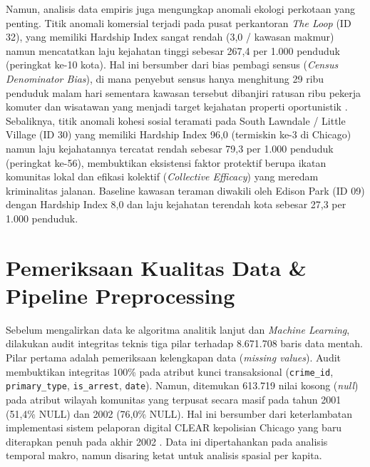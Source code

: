 \documentclass[11pt,a4paper]{article}
\begin{document}
Namun, analisis data empiris juga mengungkap anomali ekologi perkotaan yang penting. Titik anomali komersial terjadi pada pusat perkantoran \textit{The Loop} (ID 32), yang memiliki Hardship Index sangat rendah (3,0 / kawasan makmur) namun mencatatkan laju kejahatan tinggi sebesar 267,4 per 1.000 penduduk (peringkat ke-10 kota). Hal ini bersumber dari bias pembagi sensus (\textit{Census Denominator Bias}), di mana penyebut sensus hanya menghitung 29 ribu penduduk malam hari sementara kawasan tersebut dibanjiri ratusan ribu pekerja komuter dan wisatawan yang menjadi target kejahatan properti oportunistik \cite{campedelli2020}. Sebaliknya, titik anomali kohesi sosial teramati pada South Lawndale / Little Village (ID 30) yang memiliki Hardship Index 96,0 (termiskin ke-3 di Chicago) namun laju kejahatannya tercatat rendah sebesar 79,3 per 1.000 penduduk (peringkat ke-56), membuktikan eksistensi faktor protektif berupa ikatan komunitas lokal dan efikasi kolektif (\textit{Collective Efficacy}) yang meredam kriminalitas jalanan. Baseline kawasan teraman diwakili oleh Edison Park (ID 09) dengan Hardship Index 8,0 dan laju kejahatan terendah kota sebesar 27,3 per 1.000 penduduk.

\section{Pemeriksaan Kualitas Data \& Pipeline Preprocessing}

Sebelum mengalirkan data ke algoritma analitik lanjut dan \textit{Machine Learning}, dilakukan audit integritas teknis tiga pilar terhadap 8.671.708 baris data mentah. Pilar pertama adalah pemeriksaan kelengkapan data (\textit{missing values}). Audit membuktikan integritas 100\% pada atribut kunci transaksional (\texttt{crime\_id}, \texttt{primary\_type}, \texttt{is\_arrest}, \texttt{date}). Namun, ditemukan 613.719 nilai kosong (\textit{null}) pada atribut wilayah komunitas yang terpusat secara masif pada tahun 2001 (51,4\% NULL) dan 2002 (76,0\% NULL). Hal ini bersumber dari keterlambatan implementasi sistem pelaporan digital CLEAR kepolisian Chicago yang baru diterapkan penuh pada akhir 2002 \cite{skogan2016}. Data ini dipertahankan pada analisis temporal makro, namun disaring ketat untuk analisis spasial per kapita.
\end{document}
